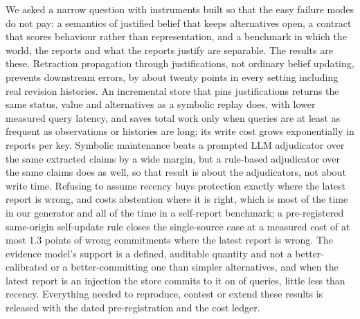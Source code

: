 We asked a narrow question with instruments built so that the easy failure modes do not pay: a semantics of justified belief that keeps alternatives open, a contract that scores behaviour rather than representation, and a benchmark in which the world, the reports and what the reports justify are separable. The results are these. Retraction propagation through justifications, not ordinary belief updating, prevents downstream errors, by about twenty points in every setting including real revision histories. An incremental store that pins justifications returns the same status, value and alternatives as a symbolic replay does, with lower measured query latency, and saves total work only when queries are at least as frequent as observations or histories are long; its write cost grows exponentially in reports per key. Symbolic maintenance beats a prompted LLM adjudicator over the same extracted claims by a wide margin, but a rule-based adjudicator over the same claims does as well, so that result is about the adjudicators, not about write time. Refusing to assume recency buys protection exactly where the latest report is wrong, and costs abstention where it is right, which is most of the time in our generator and all of the time in a self-report benchmark; a pre-registered same-origin self-update rule closes the single-source case at a measured cost of at most 1.3 points of wrong commitments where the latest report is wrong. The evidence model's support is a defined, auditable quantity and not a better-calibrated or a better-committing one than simpler alternatives, and when the latest report is an injection the store commits to it on \rgPoisPalInj{} of queries, little less than recency. Everything needed to reproduce, contest or extend these results is released with the dated pre-registration and the cost ledger.
